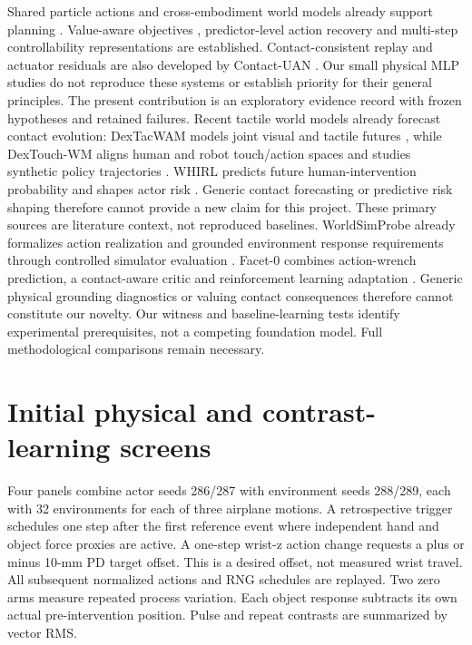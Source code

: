 \documentclass[10pt]{article}
\begin{document}
Shared particle actions and cross-embodiment world models already support planning
\cite{he2025}. Value-aware objectives \cite{farahmand2017}, predictor-level action
recovery \cite{qiu2026} and multi-step controllability representations \cite{rudolph2024}
are established. Contact-consistent replay and actuator residuals are also developed
by Contact-UAN \cite{fey2026}. Our small physical MLP studies do not reproduce these
systems or establish priority for their general principles. The present contribution
is an exploratory evidence record with frozen hypotheses and retained failures.
Recent tactile world models already forecast contact evolution: DexTacWAM models
joint visual and tactile futures \cite{yuan2026}, while DexTouch-WM aligns human
and robot touch/action spaces and studies synthetic policy trajectories
\cite{qin2026}. WHIRL predicts future human-intervention probability and shapes
actor risk \cite{yin2026}. Generic contact forecasting or predictive risk shaping
therefore cannot provide a new claim for this project. These primary sources
are literature context, not reproduced baselines.
WorldSimProbe already formalizes action realization and grounded environment
response requirements through controlled simulator evaluation \cite{co2026}.
Facet-0 combines action-wrench prediction, a contact-aware critic and reinforcement
learning adaptation \cite{deng2026}. Generic physical grounding diagnostics or
valuing contact consequences therefore cannot constitute our novelty. Our witness
and baseline-learning tests identify experimental prerequisites, not a competing
foundation model. Full methodological comparisons remain necessary.

\section{Initial physical and contrast-learning screens}
Four panels combine actor seeds 286/287 with environment seeds 288/289, each with
32 environments for each of three airplane motions. A retrospective trigger schedules
one step after the first reference event where independent hand and object force
proxies are active. A one-step wrist-z action change requests a plus or minus 10-mm
PD target offset. This is a desired offset, not measured wrist travel. All subsequent
normalized actions and RNG schedules are replayed. Two zero arms measure repeated
process variation. Each object response subtracts its own actual pre-intervention
position. Pulse and repeat contrasts are summarized by vector RMS.
\end{document}
